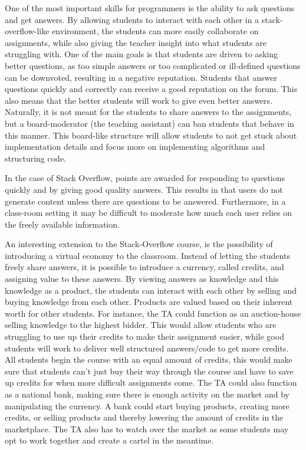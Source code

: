 \documentclass[11pt]{article}
\begin{document}
One of the most important skills for programmers is the ability to ask questions and get answers. By allowing students to interact with each other in a stack-overflow-like environment, the students can more easily collaborate on assignments, while also giving the teacher insight into what students are struggling with. One of the main goals is that students are driven to asking better questions, as too simple answers or too complicated or ill-defined questions can be downvoted, resulting in a negative reputation. Students that answer questions quickly and correctly can receive a good reputation on the forum. This also means that the better students will work to give even better answers. Naturally, it is not meant for the students to share answers to the assignments, but a board-moderator (the teaching assistant) can ban students that behave in this manner. This board-like structure will allow students to not get stuck about implementation details and focus more 
on implementing algorithms and structuring code.

In the case of Stack Overflow, points are awarded for responding to questions quickly and by giving good quality answers. This results in that users do not generate content unless there are questions to be answered. Furthermore, in a class-room setting it may be difficult to moderate how much each user relies on the freely available information.

An interesting extension to the Stack-Overflow course, is the possibility of introducing a virtual economy to the classroom. Instead of letting the students freely share answers, it is possible to introduce a currency, called credits, and assigning value to these answers. By viewing answers as knowledge and this knowledge as a product, the students can interact with each other by selling and buying knowledge from each other. Products are valued based on their inherent worth for other students. For instance, the TA could function as an auction-house selling knowledge to the highest bidder. This would allow students who are struggling to use up their credits to make their assignment easier, while good students will work to deliver well structured answers/code to get more credits. All students begin the course with an equal amount of credits, this would make sure that students can’t just buy their way through the course and have to save up credits for when more difficult assignments come. The TA could also 
function as a national bank, making sure there is enough activity on the market and by manipulating the currency. A bank could start buying products, creating more credits, or selling products and thereby lowering the amount of credits in the marketplace. The TA also has to watch over the market as some students may opt to work together and create a cartel in the meantime. 
\end{document}
